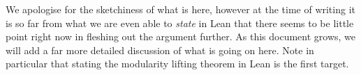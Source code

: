 We apologise for the sketchiness of what is here, however at the time of writing it is so far from what we are even able to \emph{state} in Lean that there seems to be little point right now in fleshing out the argument further. As this document grows, we will add a far more detailed discussion of what is going on here. Note in particular that stating the modularity lifting theorem in Lean is the first target.






